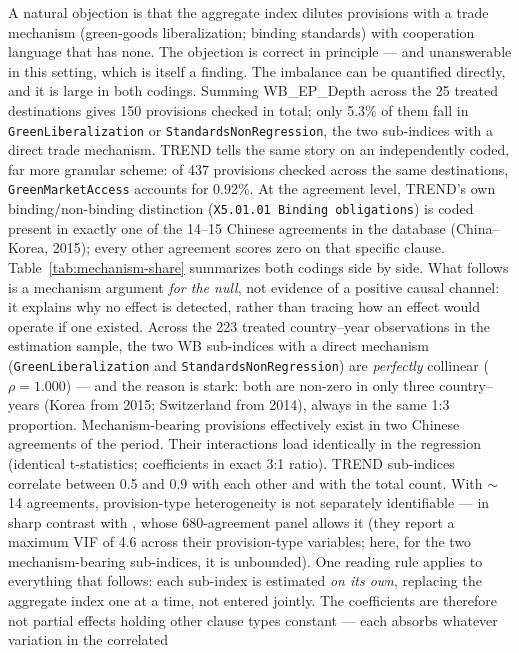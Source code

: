 \documentclass[12pt]{article}
\begin{document}
A natural objection is that the aggregate index dilutes provisions with a trade
mechanism (green-goods liberalization; binding standards) with cooperation language that
has none. The objection is correct in principle --- and unanswerable in this setting,
which is itself a finding. The imbalance can be quantified directly, and it is large in
both codings. Summing WB\_EP\_Depth across the 25 treated destinations gives 150
provisions checked in total; only 5.3\% of them fall in \texttt{GreenLiberalization} or
\texttt{StandardsNonRegression}, the two sub-indices with a direct trade mechanism.
TREND tells the same story on an independently coded, far more granular scheme: of 437
provisions checked across the same destinations, \texttt{GreenMarketAccess} accounts for
0.92\%. At the agreement level, TREND's own binding/non-binding distinction
(\texttt{X5.01.01 Binding obligations}) is coded present in exactly one of the 14--15
Chinese agreements in the database (China--Korea, 2015); every other agreement scores
zero on that specific clause. Table~\ref{tab:mechanism-share} summarizes both codings
side by side. What follows is a mechanism argument \emph{for the null}, not
evidence of a positive causal channel: it explains why no effect is detected, rather
than tracing how an effect would operate if one existed. Across the 223 treated country--year observations in the
estimation sample, the two WB sub-indices with a direct mechanism
(\texttt{GreenLiberalization} and \texttt{StandardsNonRegression}) are \emph{perfectly}
collinear ($\rho = 1.000$) --- and the reason is stark: both are non-zero in only three
country--years (Korea from 2015; Switzerland from 2014), always in the same 1:3
proportion. Mechanism-bearing provisions effectively exist in two Chinese agreements of
the period. Their interactions load identically in the regression (identical
t-statistics; coefficients in exact 3:1 ratio). TREND
sub-indices correlate between 0.5 and 0.9 with each other and with the total count.
With $\sim$14 agreements, provision-type heterogeneity is not separately identifiable
--- in sharp contrast with \citet{brandi2020}, whose 680-agreement panel allows it (they
report a maximum VIF of 4.6 across their provision-type variables; here, for the two
mechanism-bearing sub-indices, it is unbounded). One reading rule applies to everything
that follows: each sub-index is estimated \emph{on its own}, replacing the aggregate index
one at a time, not entered jointly. The coefficients are therefore not partial effects
holding other clause types constant --- each absorbs whatever variation in the correlated
\end{document}
